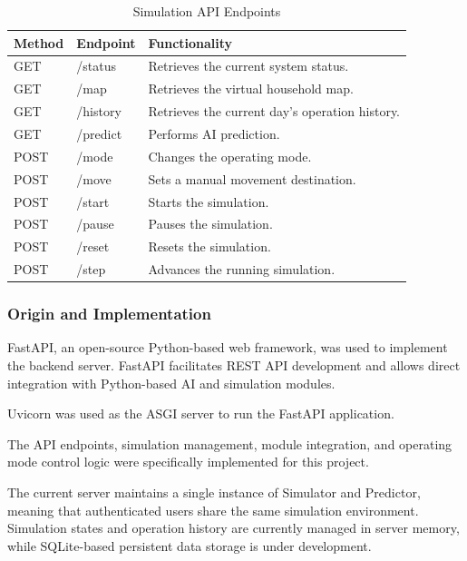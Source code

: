 \documentclass[conference]{IEEEtran}
\newlength{\tablebodywidth}
\begin{document}
\begin{table}[!t]
\caption{Simulation API Endpoints}
\label{tab:t8}
\centering\footnotesize
\setlength{\tabcolsep}{3pt}
\setlength{\tablebodywidth}{\dimexpr\columnwidth-18pt\relax}
\begin{tabular}{>{\raggedright\arraybackslash}p{0.180\tablebodywidth}>{\raggedright\arraybackslash}p{0.240\tablebodywidth}>{\raggedright\arraybackslash}p{0.580\tablebodywidth}}
\toprule
\textbf{Method} & \textbf{Endpoint} & \textbf{Functionality} \\
\midrule
GET & /status & Retrieves the current system status. \\
GET & /map & Retrieves the virtual household map. \\
GET & /history & Retrieves the current day's operation history. \\
GET & /predict & Performs AI prediction. \\
POST & /mode & Changes the operating mode. \\
POST & /move & Sets a manual movement destination. \\
POST & /start & Starts the simulation. \\
POST & /pause & Pauses the simulation. \\
POST & /reset & Resets the simulation. \\
POST & /step & Advances the running simulation. \\
\bottomrule
\end{tabular}
\end{table}

\subsubsection{Origin and Implementation}

FastAPI, an open-source Python-based web framework, was used to implement the backend server. FastAPI facilitates REST API development and allows direct integration with Python-based AI and simulation modules.

Uvicorn was used as the ASGI server to run the FastAPI application.

The API endpoints, simulation management, module integration, and operating mode control logic were specifically implemented for this project.

The current server maintains a single instance of Simulator and Predictor, meaning that authenticated users share the same simulation environment. Simulation states and operation history are currently managed in server memory, while SQLite-based persistent data storage is under development.
\end{document}
